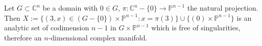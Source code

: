 Let $G \subset \mathbb{C}^n$ be a domain with $0 \in G$, $\pi: \mathbb{C}^n - \{0\} \to \mathbb{P}^{n-1}$ the natural projection. Then $X := \{(3, x) \in (G - \{0\}) \times \mathbb{P}^{n-1}: x = \pi(3)\} \cup \{(0) \times \mathbb{P}^{n-1}\}$ is an analytic set of codimension $n-1$ in $G \times \mathbb{P}^{n-1}$ which is free of singularities, therefore an $n$-dimensional complex manifold.
